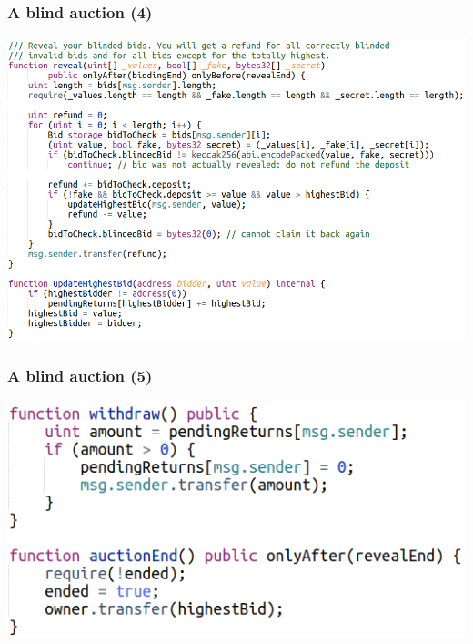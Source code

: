 \documentclass[11pt]{beamer}  %
\begin{document}
\begin{frame}\frametitle{A blind auction (4)}

  \begin{center}
    \includegraphics[scale=0.35,clip=false]{pictures/blind-auction-3.png}
  \end{center}

\end{frame}

\begin{frame}\frametitle{A blind auction (5)}

  \begin{center}
    \includegraphics[scale=0.5,clip=false]{pictures/blind-auction-4.png}
  \end{center}

\end{frame}
\end{document}
